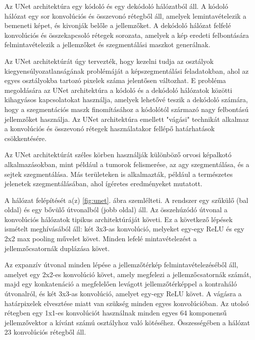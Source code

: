 \documentclass[12pt,a4]{article}
\begin{document}
                Az UNet architektúra egy kódoló és egy dekódoló hálózatból áll. A kódoló hálózat egy sor konvolúciós és összevonó rétegből áll, amelyek lemintavételezik a bemeneti képet, és kivonják belőle a jellemzőket. A dekódoló hálózat felfelé konvolúciós és összekapcsoló rétegek sorozata, amelyek a kép eredeti felbontására felmintavételezik a jellemzőket és szegmentálási maszkot generálnak.
    
                Az UNet architektúrát úgy tervezték, hogy kezelni tudja az osztályok kiegyensúlyozatlanságának problémáját a képszegmentálási feladatokban, ahol az egyes osztályokba tartozó pixelek száma jelentősen változhat. E probléma megoldására az UNet architektúra a kódoló és a dekódoló hálózatok közötti kihagyásos kapcsolatokat használja, amelyek lehetővé teszik a dekódoló számára, hogy a szegmentációs maszk finomításához a kódolótól származó nagy felbontású jellemzőket használja. Az UNet architektúra emellett "vágási" technikát alkalmaz a konvolúciós és összevonó rétegek használatakor fellépő határhatások csökkentésére.
    
                Az UNet architektúrát széles körben használják különböző orvosi képalkotó alkalmazásokban, mint például a tumorok felismerése, az agy szegmentálása, és a sejtek szegmentálása. Más területeken is  alkalmazták, például a természetes jelenetek szegmentálásában, ahol ígéretes eredményeket mutatott.
    
                A hálózat felépítését a(z) \ref{fig:unet}. ábra szemlélteti. A rendszer egy szűkülő (bal oldal) és egy bővülő útvonalból (jobb oldal) áll. Az összehúzódó útvonal a konvolúciós hálózatok tipikus architektúráját követi. Ez a következő lépések ismételt meghívásából áll: 
                két 3x3-as konvolúció, melyeket egy-egy ReLU és egy 2x2 max pooling művelet követ. Minden lefelé mintavételezést a jellemzőcsatornák duplázása követ. 
    
                Az expanzív útvonal minden lépése a jellemzőtérkép felmintavételezéséből áll, amelyet egy 2x2-es konvolúció követ, amely megfelezi a jellemzőcsatornák számát, majd egy konkatenáció a megfelelően levágott jellemzőtérképpel a kontraháló útvonalról, és két 3x3-as konvolúció, amelyet egy-egy ReLU követ. A vágásra a határpixelek elvesztése miatt van szükség minden egyes konvolúcióban. Az utolsó rétegben egy 1x1-es konvolúciót használnak minden egyes 64 komponensű jellemzővektor a kívánt számú osztályhoz való kötéséhez. Összességében a hálózat 23 konvolúciós rétegből áll.
    
\end{document}
